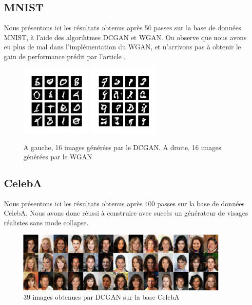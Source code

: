 \subsection{MNIST}

Nous présentons ici les résultats obtenus après 50 passes sur la base de données MNIST, à l'aide des algorihtmes DCGAN et WGAN. On observe que nous avons eu plus de mal dans l'implémentation du WGAN, et n'arrivons pas à obtenir le gain de performance prédit par l'article \cite{arjovsky_wasserstein_2017}.

\begin{figure}[!h]
\centering
\includegraphics[width=100pt]{"images/GAN/MNIST_DCGAN"}
\includegraphics[width=100pt]{"images/GAN/MNIST_WGAN"}
\caption{A gauche, 16 images générées par le DCGAN. A droite, 16 images générées par le WGAN}
\label{mnist_gan}
\end{figure}

\subsection{CelebA}

Nous présentons ici les résultats obtenus après 400 passes sur la base de données CelebA. Nous avons donc réussi à construire avec succès un générateur de visages réalistes sans mode collapse.

\begin{figure}[!h]
\centering
\includegraphics[width=300pt]{"images/GAN/DCGAN"}
\caption{39 images obtenues par DCGAN sur la base CelebA}
\label{celeb_gan}
\end{figure}